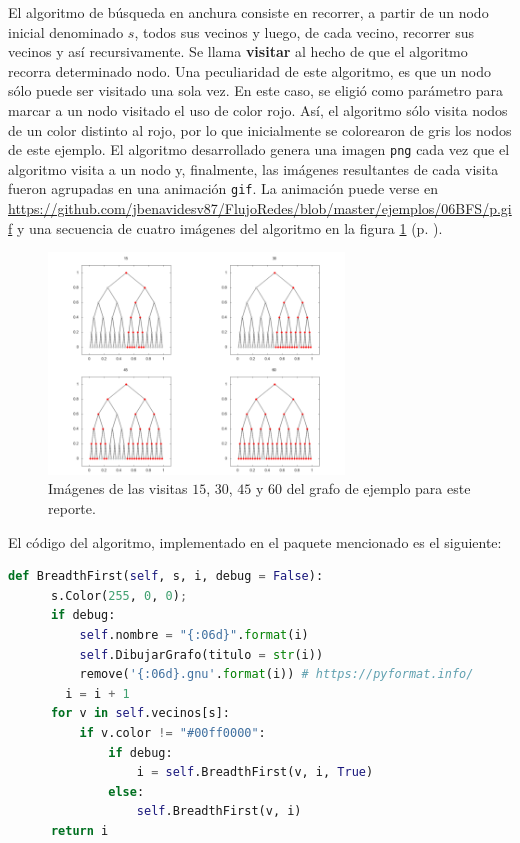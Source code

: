 \documentclass{article}
\begin{document}
  El algoritmo de búsqueda en anchura consiste en recorrer, a partir de un nodo inicial denominado $s$, todos sus vecinos y luego, de cada vecino, recorrer sus vecinos y así recursivamente. Se llama \textbf{visitar} al hecho de que el algoritmo recorra determinado nodo. Una peculiaridad de este algoritmo, es que un nodo sólo puede ser visitado una sola vez. En este caso, se eligió como parámetro para marcar a un nodo visitado el uso de color rojo. Así, el algoritmo sólo visita nodos de un color distinto al rojo, por lo que inicialmente se colorearon de gris los nodos de este ejemplo. El algoritmo desarrollado genera una imagen \texttt{png} cada vez que el algoritmo visita a un nodo y, finalmente, las imágenes resultantes de cada visita fueron agrupadas en una animación \texttt{gif}. La animación puede verse en \url{https://github.com/jbenavidesv87/FlujoRedes/blob/master/ejemplos/06BFS/p.gif} y una secuencia de cuatro imágenes del algoritmo en la figura \ref{ejemploBusqueda} (p. \pageref{ejemploBusqueda}).

  \begin{figure}[h]
    \includegraphics[width=0.7\textwidth]{ejemploBusqueda}
    \centering
    \caption{Imágenes de las visitas $15$, $30$, $45$ y $60$ del grafo de ejemplo para este reporte.}
    \label{ejemploBusqueda}
  \end{figure}

  El código del algoritmo, implementado en el paquete mencionado es el siguiente:

  \begin{lstlisting}[language=Python]
    def BreadthFirst(self, s, i, debug = False):
      s.Color(255, 0, 0);
      if debug:
          self.nombre = "{:06d}".format(i)
          self.DibujarGrafo(titulo = str(i))
          remove('{:06d}.gnu'.format(i)) # https://pyformat.info/
        i = i + 1
      for v in self.vecinos[s]:
          if v.color != "#00ff0000":
              if debug:
                  i = self.BreadthFirst(v, i, True)
              else:
                  self.BreadthFirst(v, i)
      return i
  \end{lstlisting}
\end{document}

